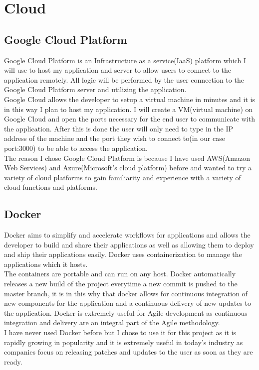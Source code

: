 \section{Cloud}
\subsection{Google Cloud Platform}
Google Cloud Platform is an Infrastructure as a service(IaaS) platform which I will use to host my application and server to allow users to connect to the application remotely\cite{GoogleCloudPlatform}.  All logic will be performed by the user connection to the Google Cloud Platform server and utilizing the application.
\\
Google Cloud allows the developer to setup a virtual machine in minutes and it is in this way I plan to host my application.  I will create a VM(virtual machine) on Google Cloud and open the ports necessary for the end user to communicate with the application.  After this is done the user will only need to type in the IP address of the machine and the port they wish to connect to(in our case port:3000) to be able to access the application.
\\
  The reason I chose Google Cloud Platform is because I have used AWS(Amazon Web Services) and Azure(Microsoft's cloud platform) before and wanted to try a variety of cloud platforms to gain familiarity and experience with a variety of cloud functions and platforms.
\subsection{Docker}
Docker aims to simplify and accelerate workflows for applications and allows the developer to build and share their applications as well as allowing them to deploy and ship their applications easily\cite{Docker}.  Docker uses containerization to manage the applications which it hosts.
\\
 The containers are portable and can run on any host.  Docker automatically releases a new build of the project everytime a new commit is pushed to the master branch, it is in this why that docker allows for continuous integration of new components for the application and a continuous delivery of new updates to the application.  Docker is extremely useful for Agile development as continuous integration and delivery are an integral part of the Agile methodology.
\\
  I have never used Docker before but I chose to use it for this project as it is rapidly growing in popularity and it is extremely useful in today's industry as companies focus on releasing patches and updates to the user as soon as they are ready.
